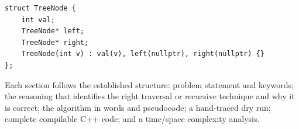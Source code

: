 \begin{lstlisting}
struct TreeNode {
    int val;
    TreeNode* left;
    TreeNode* right;
    TreeNode(int v) : val(v), left(nullptr), right(nullptr) {}
};
\end{lstlisting}

Each section follows the established structure: problem statement and
keywords; the reasoning that identifies the right traversal or recursive
technique and why it is correct; the algorithm in words and pseudocode; a
hand-traced dry run; complete compilable C++ code; and a time/space
complexity analysis.

\newpage



































